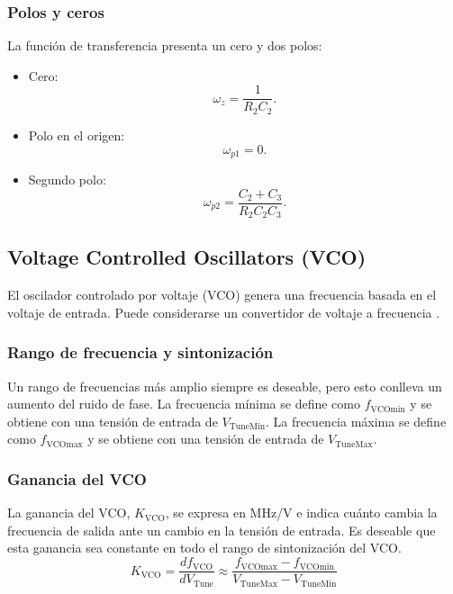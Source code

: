 \subsubsection{Polos y ceros}

La función de transferencia presenta un cero y dos polos:

\begin{itemize}
\item Cero:
\begin{equation}
\omega_z = \frac{1}{R_2C_2}.
\end{equation}

\item Polo en el origen:
\begin{equation}
\omega_{p1} = 0.
\end{equation}

\item Segundo polo:
\begin{equation}
\omega_{p2} = \frac{C_2 + C_3}{R_2C_2C_3}.
\end{equation}
\end{itemize}

\subsection{Voltage Controlled Oscillators (VCO)}

El oscilador controlado por voltaje (VCO) genera una frecuencia basada en el voltaje de entrada. Puede considerarse un convertidor de voltaje a frecuencia \cite{Dean Banerjee}.

\subsubsection{Rango de frecuencia y sintonización}
Un rango de frecuencias más amplio siempre es deseable, pero esto conlleva un aumento del ruido de fase. La frecuencia mínima se define como $f_{\text{VCOmin}}$ y se obtiene con una tensión de entrada de $V_{\text{TuneMin}}$. La frecuencia máxima se define como $f_{\text{VCOmax}}$ y se obtiene con una tensión de entrada de $V_{\text{TuneMax}}$.

\subsubsection{Ganancia del VCO}
La ganancia del VCO, $K_{\text{VCO}}$, se expresa en MHz/V e indica cuánto cambia la frecuencia de salida ante un cambio en la tensión de entrada. Es deseable que esta ganancia sea constante en todo el rango de sintonización del VCO.
\begin{equation}
K_{\text{VCO}} = \frac{df_{\text{VCO}}}{dV_{\text{Tune}}} \approx \frac{f_{\text{VCOmax}} - f_{\text{VCOmin}}}{V_{\text{TuneMax}} - V_{\text{TuneMin}}}
\end{equation}

